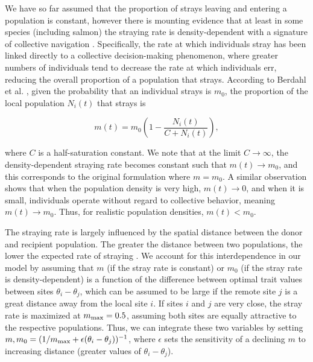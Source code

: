 \documentclass[twocolumn,preprintnumbers,amsmath,amssymb,superscriptaddress]{revtex4}
\begin{document}
\noindent We have so far assumed that the proportion of strays leaving and entering a population is constant, however there is mounting evidence that at least in some species (including salmon) the straying rate is density-dependent with a signature of collective navigation \cite{Berdahl:2016dx,Bett:2017ha}.
Specifically, the rate at which individuals stray has been linked directly to a collective decision-making phenomenon, where greater numbers of individuals tend to decrease the rate at which individuals err, reducing the overall proportion of a population that strays.
According to Berdahl et al. \cite{Berdahl:2014bl,Berdahl:2016dx}, given the probability that an individual strays is $m_0$, the proportion of the local population $N_i(t)$ that strays is

\begin{equation}
  m(t) = m_0\left(1- \frac{N_i(t)}{C+N_i(t)}\right),
  \label{eq:ddm}
\end{equation}

\noindent where $C$ is a half-saturation constant.
We note that at the limit $C\rightarrow \infty$, the density-dependent straying rate becomes constant such that $m(t) \rightarrow m_0$, and this corresponds to the original formulation where $m=m_0$.
A similar observation shows that when the population density is very high, $m(t) \rightarrow 0$, and when it is small, individuals operate without regard to collective behavior, meaning $m(t) \rightarrow m_0$.
Thus, for realistic population densities, $m(t) < m_0$.\\



The straying rate is largely influenced by the spatial distance between the donor and recipient population.
The greater the distance between two populations, the lower the expected rate of straying \cite{H:2013fs,Westley:2015to}.
We account for this interdependence in our model by assuming that $m$ (if the stray rate is constant) or $m_0$ (if the stray rate is density-dependent) is a function of the difference between optimal trait values between sites $\theta_i-\theta_j$, which can be assumed to be large if the remote site $j$ is a great distance away from the local site $i$.
If sites $i$ and $j$ are very close, the stray rate is maximized at $m_{\rm max} = 0.5$, assuming both sites are equally attractive to the respective populations.
Thus, we can integrate these two variables by setting $m,m_0 = (1/m_{\rm max} + \epsilon (\theta_i-\theta_j))^{-1}$, where $\epsilon$ sets the sensitivity of a declining $m$ to increasing distance (greater values of $\theta_i-\theta_j$).\\
\end{document}
